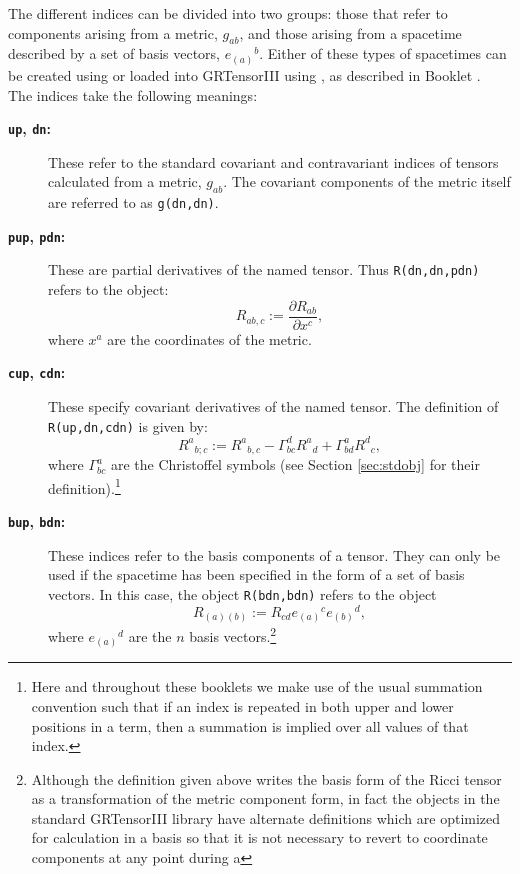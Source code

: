 \documentclass{article}
\begin{document}
The different indices can be divided into two groups: those that refer
to components arising from a metric, $g_{ab}$, and those arising from
a spacetime described by a set of basis vectors, $e_{(a)}{}^b$. Either
of these types of spacetimes can be created using  or loaded
into GRTensorIII using , as described in Booklet \grMakegRef.\\

The indices take the following meanings:
\begin{description}
  \item[\textbf{\texttt{up}, \texttt{dn}:}] 
    These refer to the standard covariant and
    contravariant indices of tensors calculated from a metric, $g_{ab}$. 
    The covariant components of the metric itself are referred to as 
    \texttt{g(dn,dn)}.
  \item[\textbf{\texttt{pup}, \texttt{pdn}:}] 
    These are partial derivatives of the
    named tensor. Thus \texttt{R(dn,dn,pdn)} refers to the object:
    \[
      R_{ab,c} := \frac{\partial R_{ab}}{\partial x^c},
    \]
    where $x^a$ are the coordinates of the metric.
  \item[\textbf{\texttt{cup}, \texttt{cdn}:}] 
    These specify covariant derivatives
    of the named tensor. The definition of \texttt{R(up,dn,cdn)} is given
    by:
    \[
      R^a{}_{b;c} := R^a{}_{b,c} - \Gamma^d_{bc} R^a{}_d + 
        \Gamma^a_{bd} R^d{}_c,
    \]
    where $\Gamma^a_{bc}$ are the Christoffel symbols (see Section 
    \ref{sec:stdobj} for their definition).\footnote{Here and 
    throughout these booklets we make use of the usual summation
    convention such that if an index is repeated in both upper and lower 
    positions in a term, then a summation is implied over all values of
    that index.}   
  \item[\textbf{\texttt{bup}, \texttt{bdn}:}] These indices refer to the basis
    components of a tensor. They can only be used if the spacetime has
    been specified in the form of a set of basis vectors. In this case,
    the object \texttt{R(bdn,bdn)} refers to the object
    \[
      R_{(a)(b)} := R_{cd} e_{(a)}{}^c e_{(b)}{}^d,
    \]
    where $e_{(a)}{}^d$ are the $n$ basis vectors.\footnote{Although
    the definition given above writes the basis form of the Ricci
    tensor as a transformation of the metric component form, in fact the
    objects in the standard GRTensorIII library have alternate definitions
    which are optimized for calculation in a basis so that it is not
    necessary to revert to coordinate components at any point during a
}
\end{description}
\end{document}
